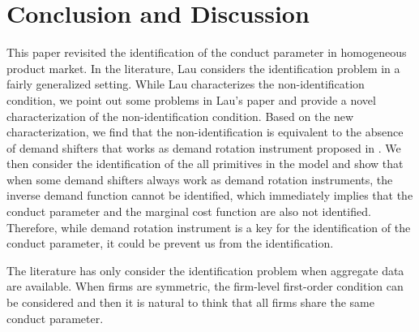 \documentclass[11pt, a4paper]{article}
\newtheorem{proposition}{Proposition}
\theoremstyle{remark}
\begin{document}

\section{Conclusion and Discussion}

This paper revisited the identification of the conduct parameter in homogeneous product market.
In the literature, Lau considers the identification problem in a fairly generalized setting.
While Lau characterizes the non-identification condition, we point out some problems in Lau's paper and provide a novel characterization of the non-identification condition.
Based on the new characterization, we find that the non-identification is equivalent to the absence of demand shifters that works as demand rotation instrument proposed in \citet{bresnahan1982oligopoly}.
We then consider the identification of the all primitives in the model and show that when some demand shifters always work as demand rotation instruments, the inverse demand function cannot be identified, which immediately implies that the conduct parameter and the marginal cost function are also not identified.
Therefore, while demand rotation instrument is a key for the identification of the conduct parameter, it could be prevent us from the identification.



The literature has only consider the identification problem when aggregate data are available.
When firms are symmetric, the firm-level first-order condition can be considered and then it is natural to think that all firms share the same conduct parameter.
\end{document}
